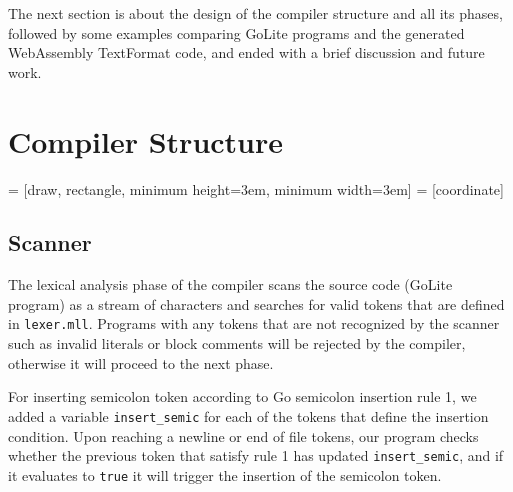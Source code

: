 \documentclass{article}
\begin{document}
The next section is about the design of the compiler structure and all its phases, followed by some examples comparing GoLite programs and the generated WebAssembly TextFormat code, and ended with a brief discussion and future work.

\section{Compiler Structure}
\begin{center}
 = [draw, rectangle, minimum height=3em, minimum width=3em]
 = [coordinate]
\end{center}

\subsection{Scanner}
The lexical analysis phase of the compiler scans the source code (GoLite program) as a stream of characters and searches for valid tokens that are defined in \verb|lexer.mll|. Programs with any tokens that are not recognized by the scanner such as invalid literals or block comments will be rejected by the compiler, otherwise it will proceed to the next phase.

For inserting semicolon token according to Go semicolon insertion rule 1, we added a variable \verb|insert_semic| for each of the tokens that define the insertion condition. Upon reaching a newline or end of file tokens, our program checks whether the previous token that satisfy rule 1 has updated \verb|insert_semic|, and if it evaluates to \verb|true| it will trigger the insertion of the semicolon token.
\end{document}
